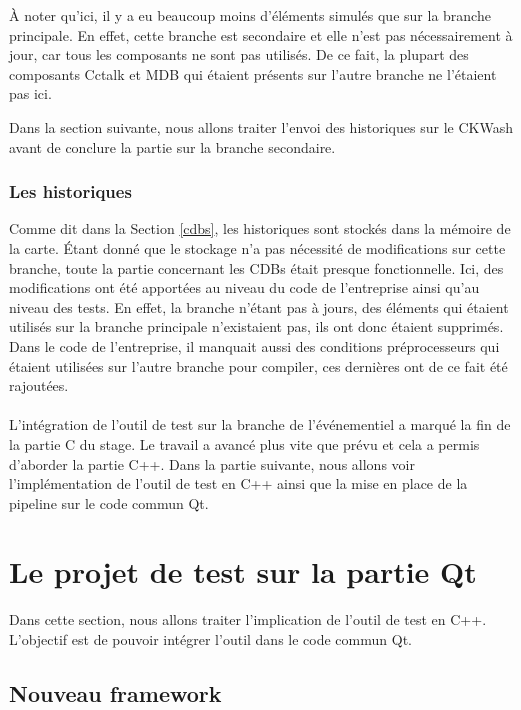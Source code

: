 \documentclass[a4paper]{article}
\begin{document}
À noter qu'ici, il y a eu beaucoup moins d'éléments simulés que sur la branche
principale. En effet, cette branche est secondaire et elle n'est pas
nécessairement à jour, car tous les composants ne sont pas utilisés. De ce fait,
la plupart des composants Cctalk et MDB qui étaient présents sur l'autre branche
ne l'étaient pas ici.

Dans la section suivante, nous allons traiter l'envoi des historiques sur le
CKWash avant de conclure la partie sur la branche secondaire.

\subsubsection*{Les historiques}

Comme dit dans la Section \ref{cdbs}, les historiques sont stockés dans la
mémoire de la carte. Étant donné que le stockage n'a pas nécessité de
modifications sur cette branche, toute la partie concernant les CDBs était presque
fonctionnelle. Ici, des modifications ont été apportées au niveau du code de
l'entreprise ainsi qu'au niveau des tests. En effet, la branche n'étant pas à
jours, des éléments qui étaient utilisés sur la branche principale n'existaient
pas, ils ont donc étaient supprimés. Dans le code de l'entreprise, il manquait
aussi des conditions préprocesseurs qui étaient utilisées sur l'autre branche
pour compiler, ces dernières ont de ce fait été rajoutées.
\\~\\

L'intégration de l'outil de test sur la branche de l'événementiel a marqué la
fin de la partie C du stage. Le travail a avancé plus vite que prévu et cela a
permis d'aborder la partie C++. Dans la partie suivante, nous allons voir
l'implémentation de l'outil de test en C++ ainsi que la mise en place de la
pipeline sur le code commun Qt.
\section{Le projet de test sur la partie Qt}%

Dans cette section, nous allons traiter l'implication de l'outil de test en
C++. L'objectif est de pouvoir intégrer l'outil dans le code commun Qt.

\subsection{Nouveau framework}%
\label{nouvframe}
\end{document}
